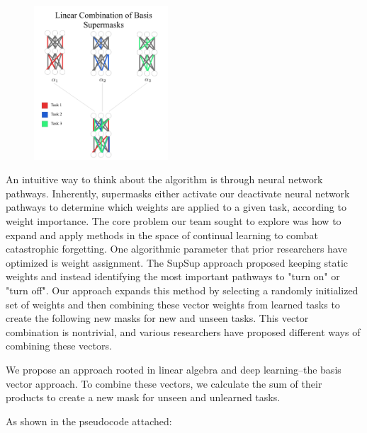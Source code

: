 \documentclass{article}
\begin{document}
\begin{figure}[htp]
    \centering
    \includegraphics[width=5cm]{neural.png}
\end{figure}


An intuitive way to think about the algorithm is through neural network pathways. Inherently, supermasks either activate our deactivate neural network pathways to determine which weights are applied to a given task, according to weight importance. The core problem our team sought to explore was how to expand and apply methods in the space of continual learning to combat catastrophic forgetting. One algorithmic parameter that prior researchers have optimized is weight assignment. The SupSup approach proposed keeping static weights and instead identifying the most important pathways to "turn on" or "turn off". Our approach expands this method by selecting a randomly initialized set of weights and then combining these vector weights from learned tasks to create the following new masks for new and unseen tasks. This vector combination is nontrivial, and various researchers have proposed different ways of combining these vectors. 

We propose an approach rooted in linear algebra and deep learning--the basis vector approach. To combine these vectors, we calculate the sum of their products to create a new mask for unseen and unlearned tasks. 

As shown in the pseudocode attached:
\end{document}
